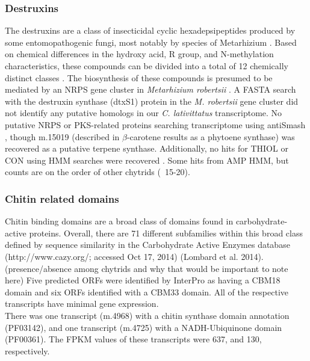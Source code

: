 \subsubsection*{Destruxins}
The destruxins are a class of insecticidal cyclic hexadepsipeptides produced by some entomopathogenic fungi, most notably by species of Metarhizium \cite{Donzelli2012,Wang2012}. Based on chemical differences in the hydroxy acid, R group, and N-methylation characteristics, these compounds can be divided into a total of 12 chemically distinct classes \cite{Pedras2002,Wang2012}. The biosynthesis of these compounds is presumed to be mediated by an NRPS gene cluster in \textit{Metarhizium robertsii} \cite{Wang2012}. A FASTA search with the destruxin synthase (dtxS1) protein in the \textit{M. robertsii} gene cluster did not identify any putative homologs in our \textit{C. lativittatus} transcriptome. No putative NRPS or PKS-related proteins searching transcriptome using antiSmash \cite{Blin2013}, though m.15019 (described in $\beta$-carotene results as a phytoene synthase) was recovered as a putative terpene synthase. Additionally, no hits for THIOL or CON using HMM searches were recovered \cite{Bushley2010}. Some hits from AMP HMM, but counts are on the order of other chytrids (~15-20).\\
\subsubsection*{Chitin related domains}
Chitin binding domains are a broad class of domains found in carbohydrate-active proteins. Overall, there are 71 different subfamilies within this broad class defined by sequence similarity in the Carbohydrate Active Enzymes database (http://www.cazy.org/; accessed Oct 17, 2014) (Lombard et al. 2014). (presence/absence among chytrids and why that would be important to note here) Five predicted ORFs were identified by InterPro as having a CBM18 domain and six ORFs identified with a CBM33 domain. All of the respective transcripts have minimal gene expression. \\
\indent There was one transcript (m.4968) with a chitin synthase domain annotation (PF03142), and one transcript (m.4725) with a NADH-Ubiquinone domain (PF00361). The FPKM values of these transcripts were 637, and 130, respectively.
